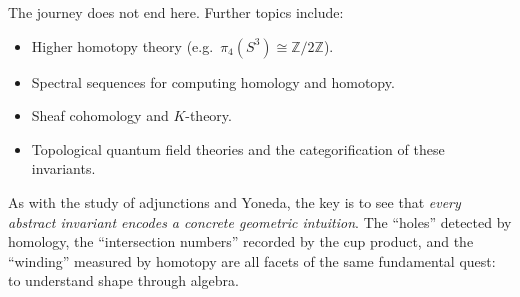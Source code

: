 \documentclass{article}
\theoremstyle{definition}
\begin{document}
The journey does not end here. Further topics include:
\begin{itemize}
    \item Higher homotopy theory (e.g.\ $\pi_4(S^3) \cong \mathbb{Z}/2\mathbb{Z}$).
    \item Spectral sequences for computing homology and homotopy.
    \item Sheaf cohomology and $K$-theory.
    \item Topological quantum field theories and the categorification of these invariants.
\end{itemize}

As with the study of adjunctions and Yoneda, the key is to see that \emph{every abstract invariant encodes a concrete geometric intuition}. The “holes” detected by homology, the “intersection numbers” recorded by the cup product, and the “winding” measured by homotopy are all facets of the same fundamental quest: to understand shape through algebra.
\end{document}
